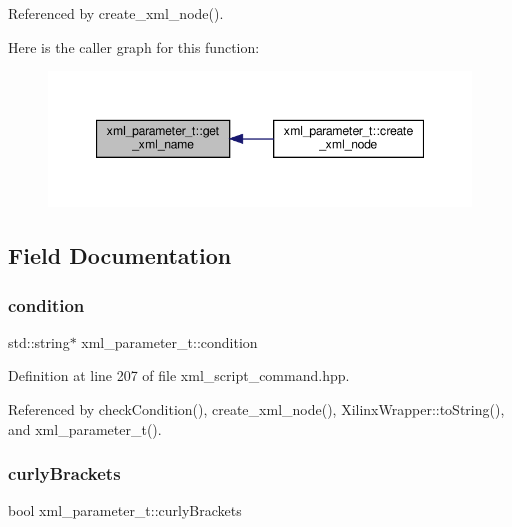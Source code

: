 Referenced by create\+\_\+xml\+\_\+node().

Here is the caller graph for this function\+:
\nopagebreak
\begin{figure}[H]
\begin{center}
\leavevmode
\includegraphics[width=347pt]{d4/dfd/classxml__parameter__t_a22e2fc519a78dbadd7dd583a5e6a5556_icgraph}
\end{center}
\end{figure}


\subsection{Field Documentation}
\mbox{\label{classxml__parameter__t_a41d9d36d2bdb280c9e828e34da158b53}} 
\subsubsection{\texorpdfstring{condition}{condition}}
{\footnotesize\ttfamily std\+::string$\ast$ xml\+\_\+parameter\+\_\+t\+::condition}



Definition at line 207 of file xml\+\_\+script\+\_\+command.\+hpp.



Referenced by check\+Condition(), create\+\_\+xml\+\_\+node(), Xilinx\+Wrapper\+::to\+String(), and xml\+\_\+parameter\+\_\+t().

\mbox{\label{classxml__parameter__t_a71489b0ad28ba0740a7c968a8f4e3684}} 
\subsubsection{\texorpdfstring{curly\+Brackets}{curlyBrackets}}
{\footnotesize\ttfamily bool xml\+\_\+parameter\+\_\+t\+::curly\+Brackets}



